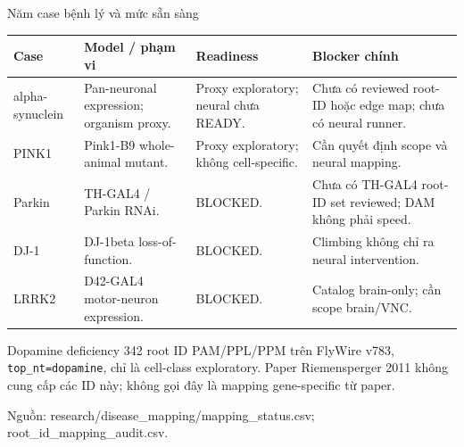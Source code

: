\documentclass[10pt,aspectratio=169]{beamer}
\newcommand{\source}[1]{\par\vfill{\fontsize{6.0}{7}\selectfont\color{gray}Nguồn: #1\par}}
\newcommand{\smallgap}{\vspace{0.18cm}}
\begin{document}
\begin{frame}{Năm case bệnh lý và mức sẵn sàng}
\renewcommand{\arraystretch}{1.25}\scriptsize
\begin{tabular}{@{}L{2.2cm}L{3.6cm}L{3.7cm}L{4.8cm}@{}}
\toprule
\textbf{Case} & \textbf{Model / phạm vi} & \textbf{Readiness} & \textbf{Blocker chính}\\\midrule
alpha-synuclein & Pan-neuronal expression; organism proxy. & Proxy exploratory; neural chưa READY. & Chưa có reviewed root-ID hoặc edge map; chưa có neural runner.\\
PINK1 & Pink1-B9 whole-animal mutant. & Proxy exploratory; không cell-specific. & Cần quyết định scope và neural mapping.\\
Parkin & TH-GAL4 / Parkin RNAi. & BLOCKED. & Chưa có TH-GAL4 root-ID set reviewed; DAM không phải speed.\\
DJ-1 & DJ-1beta loss-of-function. & BLOCKED. & Climbing không chỉ ra neural intervention.\\
LRRK2 & D42-GAL4 motor-neuron expression. & BLOCKED. & Catalog brain-only; cần scope brain/VNC.\\\bottomrule
\end{tabular}
\normalsize\smallgap
\begin{block}{Dopamine deficiency}
342 root ID PAM/PPL/PPM trên FlyWire v783, \texttt{top\_nt=dopamine}, chỉ là cell-class exploratory. Paper Riemensperger 2011 không cung cấp các ID này; không gọi đây là mapping gene-specific từ paper.
\end{block}
\source{research/disease\_mapping/mapping\_status.csv; root\_id\_mapping\_audit.csv.}
\end{frame}
\end{document}
